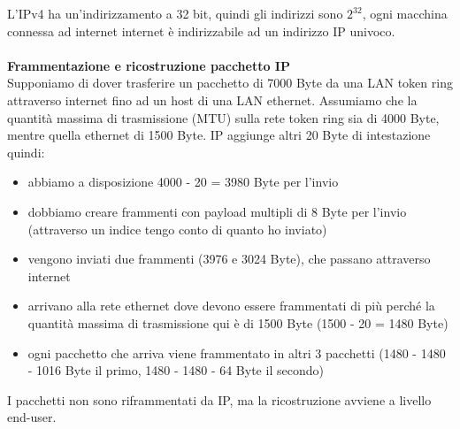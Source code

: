 \documentclass[11pt, oneside]{article}   	%
\begin{document}
L'IPv4 ha un'indirizzamento a 32 bit, quindi gli indirizzi sono $2^{32}$, ogni macchina connessa ad internet internet è indirizzabile ad un indirizzo IP univoco.\\\\
\textbf{Frammentazione e ricostruzione pacchetto IP}\\
Supponiamo di dover trasferire un pacchetto di 7000 Byte da una LAN token ring attraverso internet fino ad un host di una LAN ethernet. Assumiamo che la quantità massima di trasmissione (MTU) sulla rete token ring sia di 4000 Byte, mentre quella ethernet di 1500 Byte. IP aggiunge altri 20 Byte di intestazione quindi:
\begin{itemize}
\item abbiamo a disposizione 4000 - 20 = 3980 Byte per l'invio
\item dobbiamo creare frammenti con payload multipli di 8 Byte per l'invio (attraverso un indice tengo conto di quanto ho inviato)
\item vengono inviati due frammenti (3976 e 3024 Byte), che passano attraverso internet
\item arrivano alla rete ethernet dove devono essere frammentati di più perché la quantità massima di trasmissione qui è di 1500 Byte (1500 - 20 = 1480 Byte) \item ogni pacchetto che arriva viene frammentato in altri 3 pacchetti (1480 - 1480 - 1016 Byte il primo, 1480 - 1480 - 64 Byte il secondo)
\end{itemize}
I pacchetti non sono riframmentati da IP, ma la ricostruzione avviene a livello end-user.
\end{document}
